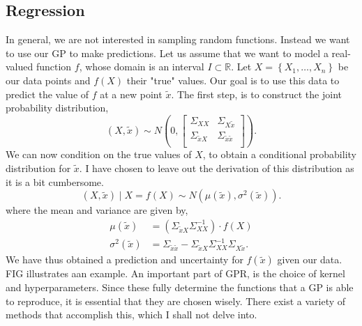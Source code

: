 \subsection{Regression}
In general, we are not interested in sampling random functions. Instead we want to use our GP to make predictions. Let us assume that we want to model a real-valued function $f$, whose domain is an interval $I \subset \mathbb{R}$. Let $X = \left\{ X_1, \ldots, X_n \right\}$ be our data points and $f\left( X \right) $ their "true" values. Our goal is to use this data to predict the value of $f$ at a new point $\widetilde{x}$. The first step, is to construct the joint probability distribution,
\[
\left( X, \widetilde{x} \right) \sim N\left( 0, 
\begin{bmatrix}
    \Sigma_{XX} & \Sigma_{X\widetilde{x}} \\
     \Sigma_{\widetilde{x}X}&  \Sigma_{\widetilde{x}\widetilde{x}}\\
\end{bmatrix}\right) 
.\]
We can now condition on the true values of $X$, to obtain a conditional probability distribution for $\widetilde{x}$. I have chosen to leave out the derivation of this distribution as it is a bit cumbersome.
 \[
\left( X, \widetilde{x} \right) \mid X = f\left( X \right) \sim N\left( \mu\left( \widetilde{x}\right) , \sigma^2\left( \widetilde{x} \right)  \right) 
.\] 
where the mean and variance are given by,
\begin{align*}
    \mu \left( \widetilde{x} \right) &= \left(   \Sigma_{\widetilde{x}X}\Sigma_{XX}^{-1}\right) \cdot  f\left( X \right) \\
    \sigma^2 \left( \widetilde{x} \right) &= \Sigma_{\widetilde{x}\widetilde{x}} - \Sigma_{\widetilde{x}X}\Sigma_{XX}^{-1}\Sigma_{X\widetilde{x}}
.\end{align*}
We have thus obtained a prediction and uncertainty for $f\left( \widetilde{x} \right) $ given our data. FIG illustrates aan example. An important part of GPR, is the choice of kernel and hyperparameters. Since these fully determine the functions that a GP is able to reproduce, it is essential that they are chosen wisely. There exist a variety of methods that accomplish this, which I shall not delve into.
% 
